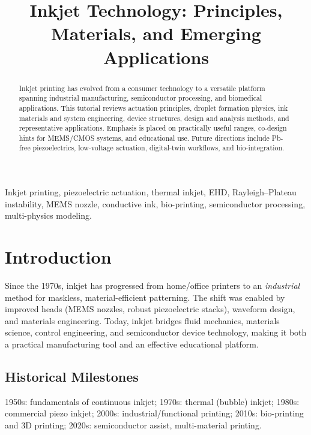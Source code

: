 \documentclass[conference]{IEEEtran}
\title{Inkjet Technology: Principles, Materials, and Emerging Applications}
\author{
\IEEEauthorblockN{Shinichi Samizo}
\IEEEauthorblockA{Independent Semiconductor Researcher\\
Project Design Hub, Samizo-AITL\\
\textit{Email:} \href{mailto:shin3t72@gmail.com}{shin3t72@gmail.com}\quad
\textit{GitHub:} \href{https://github.com/Samizo-AITL}{Samizo-AITL}}
}
\begin{document}
\maketitle

\begin{abstract}
Inkjet printing has evolved from a consumer technology to a versatile platform spanning industrial manufacturing, semiconductor processing, and biomedical applications. This tutorial reviews actuation principles, droplet formation physics, ink materials and system engineering, device structures, design and analysis methods, and representative applications. Emphasis is placed on practically useful ranges, co-design hints for MEMS/CMOS systems, and educational use. Future directions include Pb-free piezoelectrics, low-voltage actuation, digital-twin workflows, and bio-integration.
\end{abstract}

\begin{IEEEkeywords}
Inkjet printing, piezoelectric actuation, thermal inkjet, EHD, Rayleigh--Plateau instability, MEMS nozzle, conductive ink, bio-printing, semiconductor processing, multi-physics modeling.
\end{IEEEkeywords}

\section{Introduction}
Since the 1970s, inkjet has progressed from home/office printers to an \emph{industrial} method for maskless, material-efficient patterning. The shift was enabled by improved heads (MEMS nozzles, robust piezoelectric stacks), waveform design, and materials engineering. Today, inkjet bridges fluid mechanics, materials science, control engineering, and semiconductor device technology, making it both a practical manufacturing tool and an effective educational platform.

\subsection{Historical Milestones}
1950s: fundamentals of continuous inkjet; 1970s: thermal (bubble) inkjet; 1980s: commercial piezo inkjet; 2000s: industrial/functional printing; 2010s: bio-printing and 3D printing; 2020s: semiconductor assist, multi-material printing.
\end{document}
